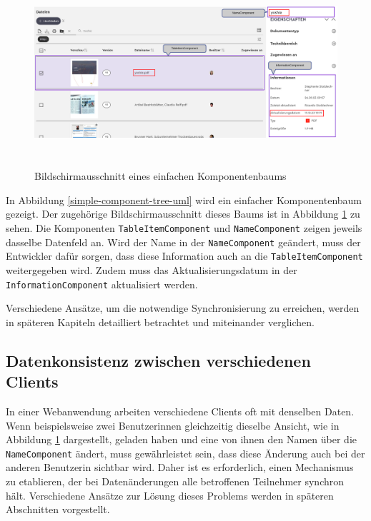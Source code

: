 \documentclass[12pt]{book}          %
\begin{document}
\begin{figure}[htbp]
\centering
\includegraphics[height=7cm]{abbildungen/simple-comp-tree-screenshot.png}
\caption{Bildschirmausschnitt eines einfachen Komponentenbaums}
\label{simple-component-tree-screenshot}
\end{figure}

In Abbildung \ref{simple-component-tree-uml} wird ein einfacher Komponentenbaum gezeigt. Der zugehörige Bildschirmausschnitt dieses Baums ist in Abbildung \ref{simple-component-tree-screenshot} zu sehen. Die Komponenten \texttt{TableItemComponent} und \texttt{NameComponent} zeigen jeweils dasselbe Datenfeld an. Wird der Name in der \texttt{NameComponent} geändert, muss der Entwickler dafür sorgen, dass diese Information auch an die \texttt{TableItemComponent} weitergegeben wird. Zudem muss das Aktualisierungsdatum in der \texttt{InformationComponent} aktualisiert werden.

Verschiedene Ansätze, um die notwendige Synchronisierung zu erreichen, werden in späteren Kapiteln detailliert betrachtet und miteinander verglichen.

\subsection{Datenkonsistenz zwischen verschiedenen Clients}
\label{subsec-datenkonsistenz-zwischen-zwei-verschiedenen-clients}

In einer Webanwendung arbeiten verschiedene Clients oft mit denselben Daten. Wenn beispielsweise zwei Benutzerinnen gleichzeitig dieselbe Ansicht, wie in Abbildung \ref{simple-component-tree-screenshot} dargestellt, geladen haben und eine von ihnen den Namen über die \texttt{NameComponent} ändert, muss gewährleistet sein, dass diese Änderung auch bei der anderen Benutzerin sichtbar wird. Daher ist es erforderlich, einen Mechanismus zu etablieren, der bei Datenänderungen alle betroffenen Teilnehmer synchron hält. Verschiedene Ansätze zur Lösung dieses Problems werden in späteren Abschnitten vorgestellt.
\end{document}
